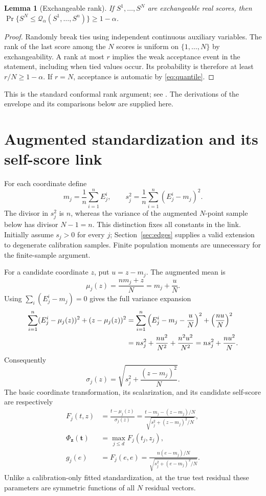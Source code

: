 \documentclass[11pt]{article}
\newtheorem{lemma}[theorem]{Lemma}
\newcommand{\tvec}{\mathbf t}
\newcommand{\zvec}{\mathbf z}
\newcommand{\Q}{\mathcal Q_\alpha}
\begin{document}
\begin{lemma}[Exchangeable rank]\label{lem:rank}
If $S^1,\ldots,S^N$ are exchangeable real scores, then
$\Pr\{S^N\le\Q(S^1,\ldots,S^n)\}\ge1-\alpha$.
\end{lemma}
\begin{proof}
Randomly break ties using independent continuous auxiliary variables. The rank
of the last score among the $N$ scores is uniform on $\{1,\ldots,N\}$ by
exchangeability. A rank at most $r$ implies the weak acceptance event in the
statement, including when tied values occur. Its probability is therefore at
least $r/N\ge1-\alpha$. If $r=N$, acceptance is automatic by
\eqref{eq:quantile}.
\end{proof}
This is the standard conformal rank argument; see \cite{shafer2008}.
The derivations of the envelope and its comparisons below are supplied here.

\section{Augmented standardization and its self-score link}
For each coordinate define
\begin{equation}\label{eq:observed}
 m_j=\frac1n\sum_{i=1}^n E^i_j,\qquad
 s_j^2=\frac1n\sum_{i=1}^n(E^i_j-m_j)^2.
\end{equation}
The divisor in $s_j^2$ is $n$, whereas the variance of the augmented $N$-point
sample below has divisor $N-1=n$. This distinction fixes all constants in the
link. Initially assume $s_j>0$ for every $j$; Section~\ref{sec:edges} supplies a
valid extension to degenerate calibration samples. Finite population moments
are unnecessary for the finite-sample argument.

For a candidate coordinate $z$, put $u=z-m_j$. The augmented mean is
\begin{equation}\label{eq:mu}
 \mu_j(z)=\frac{nm_j+z}{N}=m_j+\frac{u}{N}.
\end{equation}
Using $\sum_i(E^i_j-m_j)=0$ gives the full variance expansion
\begin{align}
 \sum_{i=1}^n(E^i_j-\mu_j(z))^2+(z-\mu_j(z))^2
 &=\sum_{i=1}^n\left(E^i_j-m_j-\frac{u}{N}\right)^2
      +\left(\frac{nu}{N}\right)^2\notag\\
 &=ns_j^2+\frac{nu^2}{N^2}+\frac{n^2u^2}{N^2}
  =ns_j^2+\frac{nu^2}{N}.\notag
\end{align}
Consequently
\begin{equation}\label{eq:sigma}
 \sigma_j(z)=\sqrt{s_j^2+\frac{(z-m_j)^2}{N}}.
\end{equation}
The basic coordinate transformation, its scalarization, and its candidate
self-score are respectively
\begin{align}
 F_j(t,z)&=\frac{t-\mu_j(z)}{\sigma_j(z)}
 =\frac{t-m_j-(z-m_j)/N}{\sqrt{s_j^2+(z-m_j)^2/N}},\label{eq:F}\\
 \Phi_{\zvec}(\tvec)&=\max_{j\le d}F_j(t_j,z_j),\label{eq:phi}\\
 g_j(e)&=F_j(e,e)
 =\frac{n(e-m_j)/N}{\sqrt{s_j^2+(e-m_j)^2/N}}.\label{eq:g}
\end{align}
Unlike a calibration-only fitted standardization, at the true test residual
these parameters are symmetric functions of all $N$ residual vectors.
\end{document}

